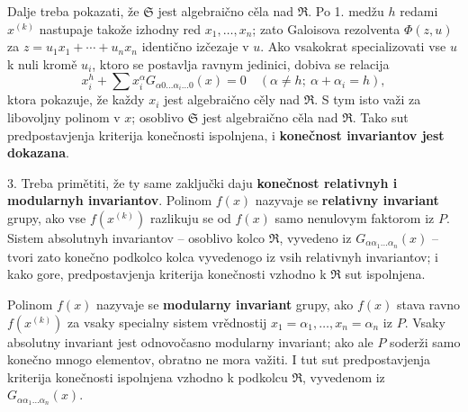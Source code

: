 \documentclass[11pt]{article}
\begin{document}
Dalje treba pokazati, že $\mathfrak S$ jest algebraično cěla nad $\mathfrak R$. Po 1. medžu $h$ redami $x^{(k)}$ nastupaje takože izhodny red $x_1,\ldots,x_n$; zato Galoisova rezolventa $\Phi(z,u)$ za $z=u_1x_1+\cdots+u_nx_n$ identično izčezaje v $u$. Ako vsakokrat specializovati vse $u$ k nuli kromě $u_i$, ktoro se postavlja ravnym jedinici, dobiva se relacija
\[
 x_i^h+\sum x_i^\alpha G_{\alpha0\ldots\alpha_i\ldots0}(x)=0
 \quad (\alpha\ne h;\ \alpha+\alpha_i=h),
\]
ktora pokazuje, že každy $x_i$ jest algebraično cěly nad $\mathfrak R$. S tym isto važi za libovoljny polinom v $x$; osoblivo $\mathfrak S$ jest algebraično cěla nad $\mathfrak R$. Tako sut predpostavjenja kriterija konečnosti ispolnjena, i \textbf{konečnost invariantov jest dokazana}.

3. Treba primětiti, že ty same zaključki daju \textbf{konečnost relativnyh i modularnyh invariantov}. Polinom $f(x)$ nazyvaje se \textbf{relativny invariant} grupy, ako vse $f(x^{(k)})$ razlikuju se od $f(x)$ samo nenulovym faktorom iz $P$. Sistem absolutnyh invariantov -- osoblivo kolco $\mathfrak R$, vyvedeno iz $G_{\alpha\alpha_1\ldots\alpha_n}(x)$ -- tvori zato konečno podkolco kolca vyvedenogo iz vsih relativnyh invariantov; i kako gore, predpostavjenja kriterija konečnosti vzhodno k $\mathfrak R$ sut ispolnjena.

Polinom $f(x)$ nazyvaje se \textbf{modularny invariant} grupy, ako $f(x)$ stava ravno $f(x^{(k)})$ za vsaky specialny sistem vrědnostij $x_1=\alpha_1,\ldots,x_n=\alpha_n$ iz $P$. Vsaky absolutny invariant jest odnovočasno modularny invariant; ako ale $P$ soderži samo konečno mnogo elementov, obratno ne mora važiti. I tut sut predpostavjenja kriterija konečnosti ispolnjena vzhodno k podkolcu $\mathfrak R$, vyvedenom iz $G_{\alpha\alpha_1\ldots\alpha_n}(x)$.

\clearpage
\end{document}
